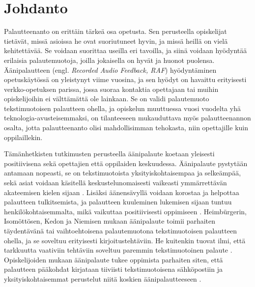 \documentclass[utf8]{gradu3}
\begin{document}

\maketitle


\mainmatter

\chapter{Johdanto}

Palautteenanto on erittäin tärkeä osa opetusta. Sen perusteella opiskelijat tietävät, missä asioissa he ovat suoriutuneet hyvin, ja missä heillä on vielä kehitettävää. Se voidaan suorittaa useilla eri tavoilla, ja siinä voidaan hyödyntää erilaisia palautemuotoja, joilla jokaisella on hyvät ja huonot puolensa. Äänipalautteen (engl. \textit{Recorded Audio Feedback, RAF}) hyödyntäminen opetuskäytössä on yleistynyt viime vuosina, ja sen hyödyt on havaittu erityisesti verkko-opetuksen parissa, jossa suoraa kontaktia opettajaan tai muihin opiskelijoihin ei välttämättä ole lainkaan. Se on validi palautemuoto tekstimuotoisen palautteen ohella, ja opiskelun muuttuessa vuosi vuodelta yhä teknologia-avusteisemmaksi, on tilanteeseen mukauduttava myös palautteenannon osalta, jotta palautteenanto olisi mahdollisimman tehokasta, niin opettajille kuin oppilaillekin.

Tämänhetkisten tutkimusten perusteella äänipalaute koetaan yleisesti positiivisena sekä opettajien että oppilaiden keskuudessa. Äänipalaute pystytään antamaan nopeasti, se on tekstimuotoista yksityiskohtaisempaa ja selkeämpää, sekä asiat voidaan käsitellä keskustelunomaisesti vaikeasti ymmärrettävän akateemisen kielen sijaan \parencite{developing}. Lisäksi äänensävyllä voidaan korostaa ja helpottaa palautteen tulkitsemista, ja palautteen kuuleminen lukemisen sijaan tuntuu henkilökohtaisemmalta, mikä vaikuttaa positiivisesti oppimiseen \parencite{attitudes}. Heimbürgerin, Isomöttösen, Kedon ja Niemisen \parencite*{academics} mukaan äänipalaute toimii parhaiten täydentävänä tai vaihtoehtoisena palautemuotona tekstimuotoisen palautteen ohella, ja se soveltuu erityisesti kirjoitustehtäviin. He kuitenkin tuovat ilmi, että tarkkuutta vaativiin tehtäviin soveltuu paremmin tekstimuotoinen palaute \parencite{academics}. Opiskelijoiden mukaan äänipalaute tukee oppimista parhaiten siten, että palautteen pääkohdat kirjataan tiiviisti tekstimuotoisena sähköpostiin ja yksityiskohtaisemmat perustelut niitä koskien äänipalautteeseen \parencite{using}.
\end{document}
